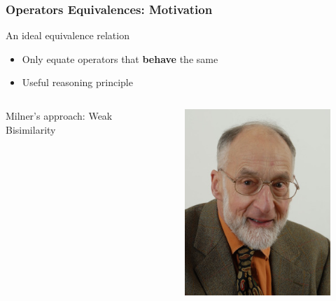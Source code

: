 \documentclass[fleqn,aspectratio=169,10pt]{beamer}
\begin{document}
\begin{frame}[fragile]
  \frametitle{Operators Equivalences: Motivation}
  \begin{block}{An ideal equivalence relation}
    \begin{itemize}
      \item Only equate operators that \textbf{behave} the same
      \item Useful reasoning principle
    \end{itemize}
  \end{block}
  \pause
  \begin{itemize}

          \begin{columns}
            \begin{column}{.42\textwidth}
              \item Milner's approach: Weak Bisimilarity
            \end{column}
            \begin{column}{.1\textwidth}
              \begin{figure}
                \includegraphics[width=1\textwidth]{milner.jpg}

\end{figure}
\end{column}
\end{columns}
\end{itemize}
\end{frame}
\end{document}
